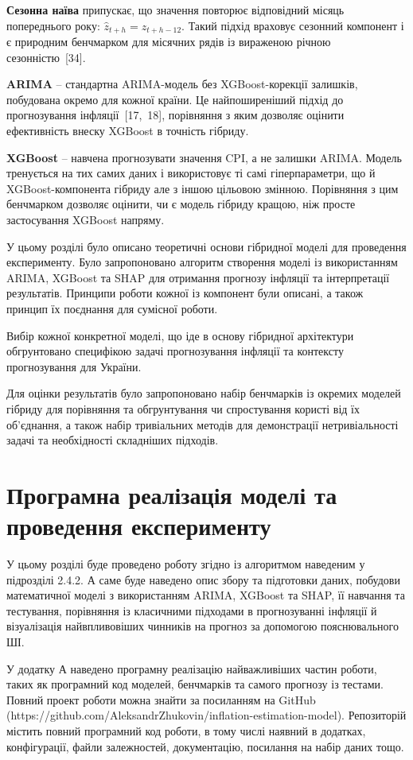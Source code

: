 \documentclass{bachelor_thesis}
\begin{document}
\textbf{Сезонна наїва} припускає, що значення повторює відповідний місяць попереднього року: $\hat{z}_{t+h} = z_{t+h-12}$. Такий підхід враховує сезонний компонент і є природним бенчмарком для місячних рядів із вираженою річною сезонністю~[34].

\textbf{ARIMA} -- стандартна ARIMA-модель без XGBoost-корекції залишків, побудована окремо для кожної країни. Це найпоширеніший підхід до прогнозування інфляції~[17,~18], порівняння з яким дозволяє оцінити ефективність внеску XGBoost в точність гібриду.

\textbf{XGBoost} -- навчена прогнозувати значення CPI, а не залишки ARIMA. Модель тренується на тих самих даних і використовує ті самі гіперпараметри, що й XGBoost-компонента гібриду але з іншою цільовою змінною. Порівняння з цим бенчмарком дозволяє оцінити, чи є модель гібриду кращою, ніж просте застосування XGBoost напряму.



У цьому розділі було описано теоретичні основи гібридної моделі для проведення експерименту. Було запропоновано алгоритм створення моделі із використанням ARIMA, XGBoost та SHAP для отримання прогнозу інфляції та інтерпретації результатів. Принципи роботи кожної із компонент були описані, а також принцип їх поєднання для сумісної роботи.

Вибір кожної конкретної моделі, що іде в основу гібридної архітектури обгрунтовано специфікою задачі прогнозування інфляції та контексту прогнозування для України.

Для оцінки результатів було запропоновано набір бенчмарків із окремих моделей гібриду для порівняння та обгрунтування чи спростування користі від їх об'єднання, а також набір тривіальних методів для демонстрації нетривіальності задачі та необхідності складніших підходів.

\chapter{Програмна реалізація моделі та проведення експерименту}

У цьому розділі буде проведено роботу згідно із алгоритмом наведеним у підрозділі 2.4.2. А саме буде наведено опис збору та підготовки даних, побудови математичної моделі з використанням ARIMA, XGBoost та  SHAP, її навчання та тестування, порівняння із класичними підходами в прогнозуванні інфляції й візуалізація найвпливовіших чинників на прогноз за допомогою пояснювального ШІ.

У додатку А наведено програмну реалізацію найважливіших частин роботи, таких як програмний код моделей, бенчмарків та самого прогнозу із тестами. Повний проект роботи можна знайти за посиланням на GitHub (https://github.com/AleksandrZhukovin/inflation-estimation-model). Репозиторій містить повний програмний код роботи, в тому числі наявний в додатках, конфігурації, файли залежностей, документацію, посилання на набір даних тощо.
\end{document}

